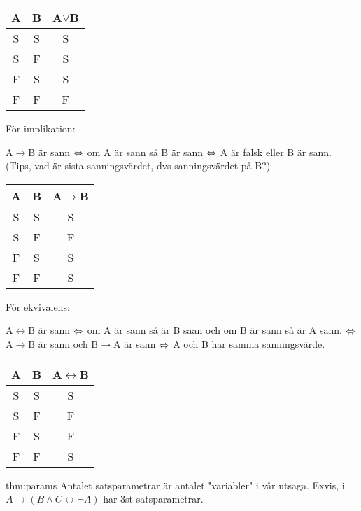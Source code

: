 \noindent\begin{tabular}{|c|c|c|}
  \hline
  A&B&A$\vee$B\\
  \hline
  S&S&S\\
  \hline
  S&F&S\\
  \hline
  F&S&S\\
  \hline
  F&F&F\\
  \hline
\end{tabular}
\par\bigskip

\noindent För implikation:
\par\bigskip
\noindent A$\rightarrow$B är sann $\Leftrightarrow$ om A är sann så B är sann $\Leftrightarrow$ A är falsk eller B är sann. (Tips, vad är sista sanningsvärdet, dvs sanningsvärdet på B?)
\par\bigskip

\noindent\begin{tabular}{|c|c|c|}
  \hline
  A&B&A$\rightarrow$B\\
  \hline
  S&S&S\\
  \hline
  S&F&F\\
  \hline
  F&S&S\\
  \hline
  F&F&S\\
  \hline
\end{tabular}
\par\bigskip

\noindent För ekvivalens:
\par\bigskip
\noindent A$\leftrightarrow$B är sann $\Leftrightarrow$ om A är sann så är B saan och om B är sann så är A sann. $\Leftrightarrow$ A$\rightarrow$B är sann och B$\rightarrow$A är sann $\Leftrightarrow$ A och B har samma sanningsvärde.
\par\bigskip

\noindent\begin{tabular}{|c|c|c|}
  \hline
  A&B&A$\leftrightarrow$B\\
  \hline
  S&S&S\\
  \hline
  S&F&F\\
  \hline
  F&S&F\\
  \hline
  F&F&S\\
  \hline
\end{tabular}
\par\bigskip

\begin{theo}[Satsparametrar]{thm:params}
  Antalet satsparametrar är antalet "variabler" i vår utsaga. Exvis, i $A\rightarrow(B\wedge C\leftrightarrow\neg A)$ har 3st satsparametrar.
\end{theo}








